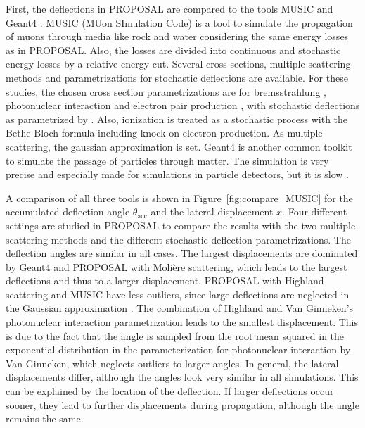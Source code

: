 \documentclass[pdflatex, sn-mathphys]{sn-jnl}%
\theoremstyle{thmstyleone}%
\theoremstyle{thmstyletwo}%
\theoremstyle{thmstylethree}%
\begin{document}
First, the deflections in PROPOSAL are compared to 
the tools MUSIC \cite{MUSIC,comparison_MUSIC_GEANT4_2009} and Geant4 \cite{GEANT4}.
MUSIC (MUon SImulation Code) is a tool to simulate the propagation of muons 
through media like rock and water considering the same energy losses as in 
PROPOSAL. Also, the losses are divided into continuous and stochastic 
energy losses by a relative energy cut. Several cross sections, multiple scattering 
methods and parametrizations for stochastic deflections are 
available. For these studies, the chosen cross section parametrizations are for bremsstrahlung \cite{Bremsstrahlung_KKP}, 
photonuclear interaction \cite{nulcint_bugaev_Shlepin, bugaev_1980_defl,bugaev_1981_defl} 
and electron pair production \cite{epair_kelner,epair_kokoulin_petrukhin}, 
with stochastic deflections as parametrized by \cite{Van_Ginneken}. 
Also, ionization is treated as a stochastic process with the Bethe-Bloch 
formula including knock-on electron production. As multiple scattering, the gaussian 
approximation \cite{HIGHLAND_1975} is set. 
Geant4 is another common toolkit to simulate the passage of particles through 
matter. The simulation is very precise and especially 
made for simulations in particle detectors, but it is slow \cite{GEANT4}. 

A comparison of all three tools is shown in Figure~\ref{fig:compare_MUSIC} 
for the 
accumulated deflection angle $\theta_{\text{acc}}$ and the lateral displacement
$x$. Four different settings are studied in PROPOSAL to compare the results with 
the two multiple scattering methods and the different stochastic deflection parametrizations.
The deflection angles are 
similar in all cases. The 
largest displacements are dominated by Geant4 and PROPOSAL with Molière scattering, which 
leads to the largest deflections and thus to a larger displacement. 
PROPOSAL with Highland scattering and MUSIC have less outliers, since large 
deflections are neglected in the Gaussian approximation \cite{HIGHLAND_1975}. 
The combination of Highland and 
Van Ginneken's photonuclear interaction parametrization leads to the smallest 
displacement. This is due to the fact that the angle is sampled from the root mean squared in the exponential distribution
in the parameterization for photonuclear interaction by Van Ginneken, which neglects 
outliers to larger angles. 
In general, the lateral displacements differ, although the angles look very similar in all simulations. 
This can be explained by the location of the deflection. If larger deflections occur sooner, 
they lead to further displacements during propagation, although the angle remains the same.
\end{document}
